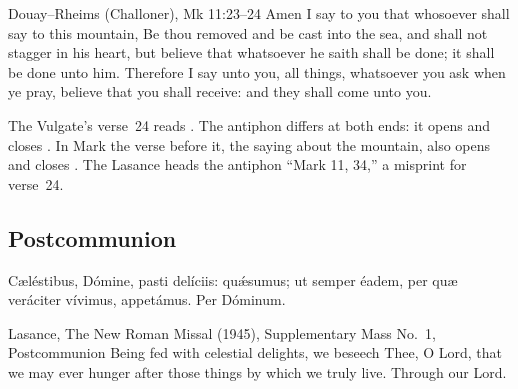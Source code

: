 \begin{englishwitness}{Douay--Rheims (Challoner), Mk 11:23--24}
Amen I say to you that whosoever shall say to this mountain, Be thou removed
and be cast into the sea, and shall not stagger in his heart, but believe that
whatsoever he saith shall be done; it shall be done unto him. Therefore I say
unto you, all things, whatsoever you ask when ye pray, believe that you shall
receive: and they shall come unto you.
\end{englishwitness}

\noindent The Vulgate's verse~24 reads . The
antiphon differs at both ends: it opens  and closes
. In Mark the verse before it, the saying about the
mountain, also opens  and closes . The
Lasance heads the antiphon ``Mark 11, 34,'' a misprint for verse~24.

\subsection{Postcommunion}
\label{proper-postcommunion}


\begin{latinproper}
Cæléstibus, Dómine, pasti delíciis: quǽsumus; ut semper éadem, per quæ
veráciter vívimus, appetámus. Per Dóminum.
\end{latinproper}

\begin{englishwitness}{Lasance, The New Roman Missal (1945), Supplementary Mass No.~1, Postcommunion}
Being fed with celestial delights, we beseech Thee, O Lord, that we may ever
hunger after those things by which we truly live. Through our Lord.
\end{englishwitness}
